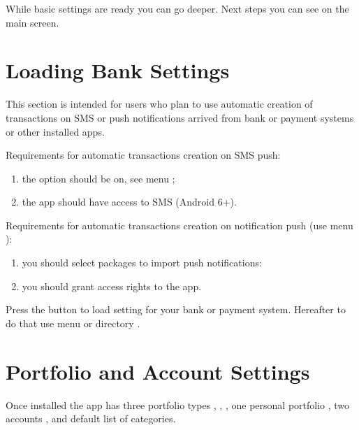 \documentclass[a4paper,10pt,english]{sphinxmanual}
\begin{document}
While basic settings are ready you can go deeper. Next steps you can see on the main screen.


\section{Loading Bank Settings}
\label{\detokenize{getting-started:loading-bank-settings}}
This section is intended for users who plan to use automatic creation of transactions on SMS or push notifications arrived
from bank or payment systems or other installed apps.

Requirements for automatic transactions creation on SMS push:
\begin{enumerate}
\def\theenumi{\arabic{enumi}}
\def\labelenumi{\theenumi .}
\makeatletter\def\p@enumii{\p@enumi \theenumi .}\makeatother
\item {} 
the option should be on, see menu ;

\item {} 
the app should have access to SMS (Android 6+).

\end{enumerate}

Requirements for automatic transactions creation on notification push (use menu ):
\begin{enumerate}
\def\theenumi{\arabic{enumi}}
\def\labelenumi{\theenumi .}
\makeatletter\def\p@enumii{\p@enumi \theenumi .}\makeatother
\item {} 
you should select packages to import push notifications:

\item {} 
you should grant access rights to the app.

\end{enumerate}

Press the button  to load setting for your bank or payment system. Hereafter
to do that use menu  or directory
.

\noindent{}

\noindent{}


\section{Portfolio and Account Settings}
\label{\detokenize{getting-started:portfolio-and-account-settings}}
Once installed the app has three portfolio types , , ,
one personal portfolio , two accounts ,  and default list of categories.
\end{document}
